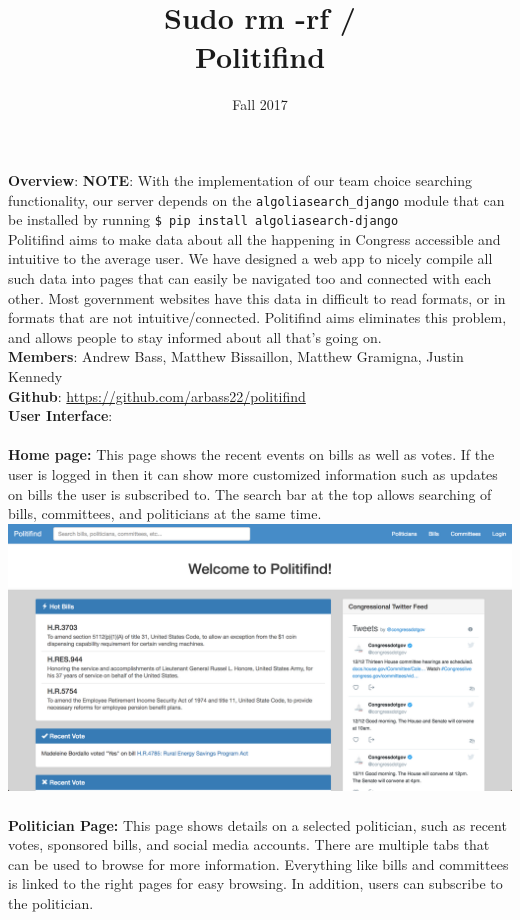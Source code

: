 \documentclass{article}
\newcommand{\n}{\noindent}
\begin{document}
\title{Sudo rm -rf / \\ \large{Politifind}}
\author{Fall 2017}
\date{}
\maketitle

\n\textbf{Overview}: \textbf{NOTE}: With the implementation of our team choice searching functionality, our server depends on the \verb|algoliasearch_django| module that can be installed by running \verb|$ pip install algoliasearch-django| \\

Politifind aims to make data about all the happening in Congress accessible and intuitive to the average user. We have designed a web app to nicely compile all such data into pages that can easily be navigated too and connected with each other. Most government websites have this data in difficult to read formats, or in formats that are not intuitive/connected. Politifind aims eliminates this problem, and allows people to stay informed about all that's going on. \\

\n\textbf{Members}: Andrew Bass, Matthew Bissaillon, Matthew Gramigna, Justin Kennedy \\

\n\textbf{Github}: \url{https://github.com/arbass22/politifind} \\

\n\textbf{User Interface}: \\\\
\textbf{Home page:} This page shows the recent events on bills as well as votes.  If the user is logged in then it can show more customized
information such as updates on bills the user is subscribed to.  The search bar at the top allows searching of bills, committees, and politicians at the same time. \\

\includegraphics[width=6in]{homepage}\\\\
\textbf{Politician Page:} This page shows details on a selected politician, such as recent votes, sponsored bills, and social media accounts.   There are multiple tabs that can be used to browse for more information.   Everything like bills and committees is linked to the right pages for easy browsing. In addition, users can subscribe to the politician.\\
\end{document}
